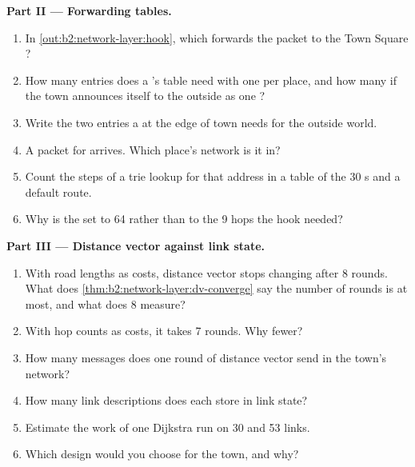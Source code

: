 \begin{problem}
\medskip\noindent\textbf{Part II --- Forwarding tables.}\par\nopagebreak
\begin{enumerate}[resume, beginpenalty=10000]
\item In \cref{out:b2:network-layer:hook}, which  forwards the packet to the Town Square ?
\item How many entries does a 's table need with one  per place, and how many if the town announces
itself to the outside as one ?
\item Write the two entries a  at the edge of town needs for the outside world.
\item A packet for  arrives. Which place's network is it in?
\item Count the steps of a trie lookup for that address in a table of the 30 s and a default route.
\item Why is the  set to 64 rather than to the 9 hops the hook needed?
\end{enumerate}

\medskip\noindent\textbf{Part III --- Distance vector against link state.}\par\nopagebreak
\begin{enumerate}[resume, beginpenalty=10000]
\item With road lengths as costs, distance vector stops changing after 8 rounds. What does
\cref{thm:b2:network-layer:dv-converge} say the number of rounds is at most, and what does 8 measure?
\item With hop counts as costs, it takes 7 rounds. Why fewer?
\item How many messages does one round of distance vector send in the town's network?
\item How many link descriptions does each  store in link state?
\item Estimate the work of one Dijkstra run on 30  and 53 links.
\item Which design would you choose for the town, and why?
\end{enumerate}


\end{problem}

